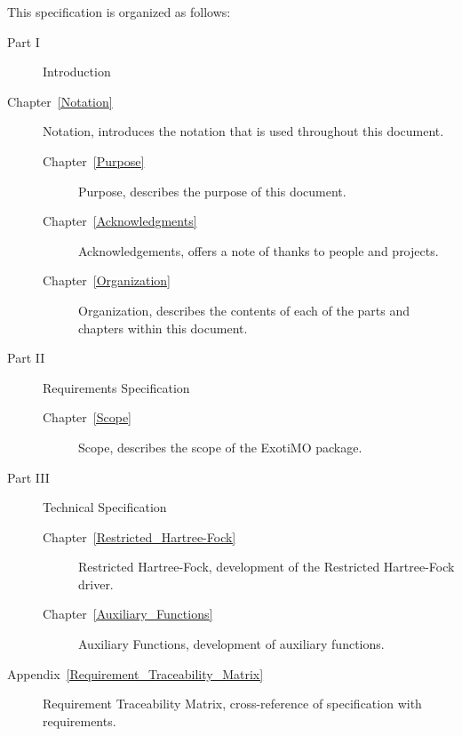 \label{Organization}

This specification is organized as follows:

\begin{description}
  \item[Part I] Introduction

  \item[Chapter~\ref{Notation}] Notation, introduces the notation that is used
    throughout this document.

    \begin{description}
      \item[Chapter~\ref{Purpose}] Purpose, describes the purpose of this document.

      \item[Chapter~\ref{Acknowledgments}] Acknowledgements, offers a note of
        thanks to people and projects.

      \item[Chapter~\ref{Organization}] Organization, describes the contents of
        each of the parts and chapters within this document.

    \end{description}

  \item[Part II] Requirements Specification

    \begin{description}
      \item[Chapter~\ref{Scope}] Scope, describes the scope of the ExotiMO package.
    \end{description}

  \item[Part III] Technical Specification
    \begin{description}
      \item[Chapter~\ref{Restricted_Hartree-Fock}] Restricted Hartree-Fock, development of the 
        Restricted Hartree-Fock driver.

      \item[Chapter~\ref{Auxiliary_Functions}] Auxiliary Functions, development of auxiliary functions.
    \end{description}

  \item[Appendix~\ref{Requirement_Traceability_Matrix}] Requirement Traceability Matrix, cross-reference of
    specification with requirements.

\end{description}
